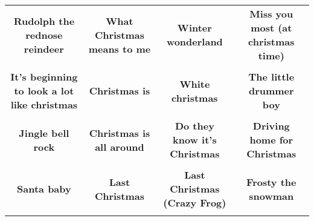 \documentclass[12pt]{article} \usepackage{eso-pic, graphicx}
\newcommand{\background}[1]{%
\AddToShipoutPictureBG*{\texttt{[image: \#1]}}
}
\begin{document}
\tabcolsep=30.2pt \renewcommand{\arraystretch}{4.5}   \vspace*{4.3cm} \begin{center}  \begin{tabular}{c c c c}
\parbox{3cm}{\centering \textbf{Rudolph the rednose reindeer}}& 
\parbox{3cm}{\centering \textbf{What Christmas means to me}}& 
\parbox{3cm}{\centering \textbf{Winter wonderland}}& 
\parbox{3cm}{\centering \textbf{Miss you most (at christmas time)}}\\ \\ 
\parbox{3cm}{\centering \textbf{It’s beginning to look a lot like christmas}}& 
\parbox{3cm}{\centering \textbf{Christmas is}}& 
\parbox{3cm}{\centering \textbf{White christmas}}& 
\parbox{3cm}{\centering \textbf{The little drummer boy}}\\ \\ 
\parbox{3cm}{\centering \textbf{Jingle bell rock}}& 
\parbox{3cm}{\centering \textbf{Christmas is all around}}& 
\parbox{3cm}{\centering \textbf{Do they know it's Christmas}}& 
\parbox{3cm}{\centering \textbf{Driving home for Christmas}}\\ \\ 
\parbox{3cm}{\centering \textbf{Santa baby}}& 
\parbox{3cm}{\centering \textbf{Last Christmas}}& 
\parbox{3cm}{\centering \textbf{Last Christmas (Crazy Frog)}}& 
\parbox{3cm}{\centering \textbf{Frosty the snowman}}\\ \\ 
\end{tabular} \background{discobingo.pdf} \end{center} 
\end{document}
